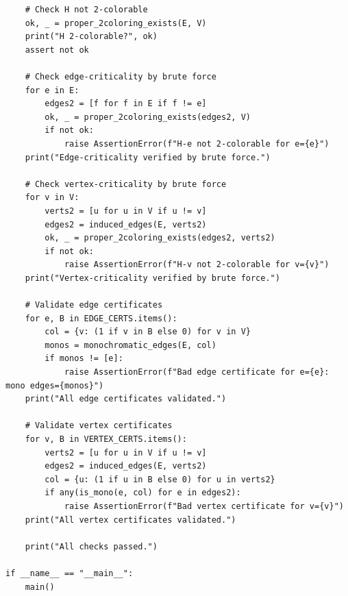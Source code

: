 \documentclass[11pt]{amsart}
\theoremstyle{definition}
\theoremstyle{remark}
\begin{document}
\begin{lstlisting}
    # Check H not 2-colorable
    ok, _ = proper_2coloring_exists(E, V)
    print("H 2-colorable?", ok)
    assert not ok

    # Check edge-criticality by brute force
    for e in E:
        edges2 = [f for f in E if f != e]
        ok, _ = proper_2coloring_exists(edges2, V)
        if not ok:
            raise AssertionError(f"H-e not 2-colorable for e={e}")
    print("Edge-criticality verified by brute force.")

    # Check vertex-criticality by brute force
    for v in V:
        verts2 = [u for u in V if u != v]
        edges2 = induced_edges(E, verts2)
        ok, _ = proper_2coloring_exists(edges2, verts2)
        if not ok:
            raise AssertionError(f"H-v not 2-colorable for v={v}")
    print("Vertex-criticality verified by brute force.")

    # Validate edge certificates
    for e, B in EDGE_CERTS.items():
        col = {v: (1 if v in B else 0) for v in V}
        monos = monochromatic_edges(E, col)
        if monos != [e]:
            raise AssertionError(f"Bad edge certificate for e={e}: mono edges={monos}")
    print("All edge certificates validated.")

    # Validate vertex certificates
    for v, B in VERTEX_CERTS.items():
        verts2 = [u for u in V if u != v]
        edges2 = induced_edges(E, verts2)
        col = {u: (1 if u in B else 0) for u in verts2}
        if any(is_mono(e, col) for e in edges2):
            raise AssertionError(f"Bad vertex certificate for v={v}")
    print("All vertex certificates validated.")

    print("All checks passed.")

if __name__ == "__main__":
    main()
\end{lstlisting}
\end{document}
